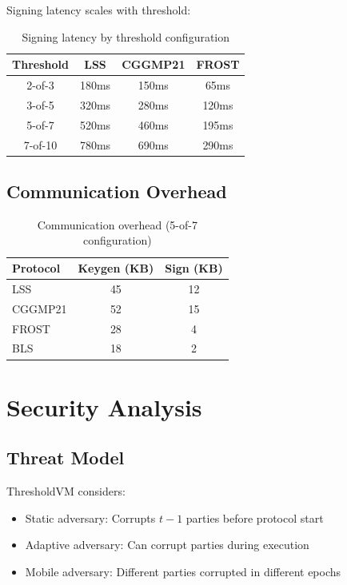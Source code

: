 \documentclass[11pt,twocolumn]{article}
\begin{document}
Signing latency scales with threshold:

\begin{table}[h]
\centering
\begin{tabular}{|c|c|c|c|}
\hline
\textbf{Threshold} & \textbf{LSS} & \textbf{CGGMP21} & \textbf{FROST} \\
\hline
2-of-3 & 180ms & 150ms & 65ms \\
3-of-5 & 320ms & 280ms & 120ms \\
5-of-7 & 520ms & 460ms & 195ms \\
7-of-10 & 780ms & 690ms & 290ms \\
\hline
\end{tabular}
\caption{Signing latency by threshold configuration}
\end{table}

\subsection{Communication Overhead}

\begin{table}[h]
\centering
\begin{tabular}{|l|c|c|}
\hline
\textbf{Protocol} & \textbf{Keygen (KB)} & \textbf{Sign (KB)} \\
\hline
LSS & 45 & 12 \\
CGGMP21 & 52 & 15 \\
FROST & 28 & 4 \\
BLS & 18 & 2 \\
\hline
\end{tabular}
\caption{Communication overhead (5-of-7 configuration)}
\end{table}

\section{Security Analysis}

\subsection{Threat Model}

ThresholdVM considers:
\begin{itemize}
\item Static adversary: Corrupts $t-1$ parties before protocol start
\item Adaptive adversary: Can corrupt parties during execution
\item Mobile adversary: Different parties corrupted in different epochs
\end{itemize}
\end{document}
